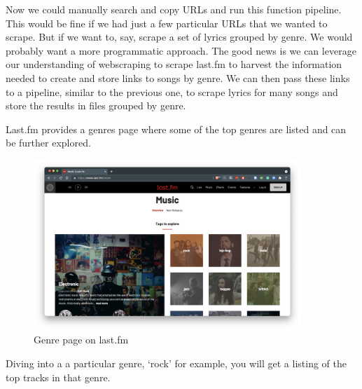 \documentclass[
  letterpaper,
]{latex/krantz}
\begin{document}
Now we could manually search and copy URLs and run this function
pipeline. This would be fine if we had just a few particular URLs that
we wanted to scrape. But if we want to, say, scrape a set of lyrics
grouped by genre. We would probably want a more programmatic approach.
The good news is we can leverage our understanding of webscraping to
scrape last.fm to harvest the information needed to create and store
links to songs by genre. We can then pass these links to a pipeline,
similar to the previous one, to scrape lyrics for many songs and store
the results in files grouped by genre.

Last.fm provides a genres page where some of the top genres are listed
and can be further explored.

\begin{figure}

{\centering \includegraphics[width=0.9\textwidth,height=\textheight]{./figures/acquire-data/ad-lastfm-genres.png}

}

\caption{\label{fig-ad-genre-page-lastfm}Genre page on last.fm}

\end{figure}

Diving into a a particular genre, `rock' for example, you will get a
listing of the top tracks in that genre.
\end{document}
